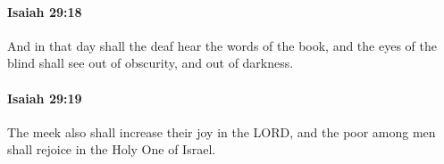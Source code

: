 		\paragraph{Isaiah 29:18} %
			\label{ISAIAH-29-18}

			And in that day shall the deaf hear the words of the book, and the eyes of the blind shall see out of obscurity, and out of darkness.


		\paragraph{Isaiah 29:19} %
			\label{ISAIAH-29-19}

			The meek also shall increase their joy in the LORD, and the poor among men shall rejoice in the Holy One of Israel.


